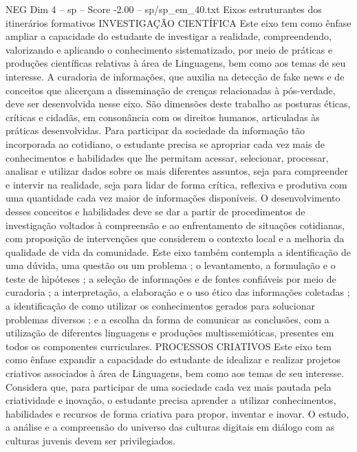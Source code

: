 \begin{textsample}{NEG Dim 4 – sp – Score -2.00 – sp/sp\_em\_40.txt}  \label{ex:f4_neg_036}
Eixos estruturantes dos itinerários formativos INVESTIGAÇÃO CIENTÍFICA Este eixo tem como ênfase ampliar a capacidade do estudante de investigar a realidade, compreendendo, valorizando e aplicando o conhecimento sistematizado, por meio de práticas e produções científicas relativas à área de Linguagens, bem como aos temas de seu interesse.
A curadoria de informações, que auxilia na detecção de fake news e de conceitos que alicerçam a disseminação de crenças relacionadas à pós-verdade, deve ser desenvolvida nesse eixo.
São dimensões deste trabalho as posturas éticas, críticas e cidadãs, em consonância com os direitos humanos, articuladas às práticas desenvolvidas.
Para participar da sociedade da informação tão incorporada ao cotidiano, o estudante precisa se apropriar cada vez mais de conhecimentos e habilidades que lhe permitam acessar, selecionar, processar, analisar e utilizar dados sobre os mais diferentes assuntos, seja para compreender e intervir na realidade, seja para lidar de forma crítica, reflexiva e produtiva com uma quantidade cada vez maior de informações disponíveis.
O desenvolvimento desses conceitos e habilidades deve se dar a partir de procedimentos de investigação voltados à compreensão e ao enfrentamento de situações cotidianas, com proposição de intervenções que considerem o contexto local e a melhoria da qualidade de vida da comunidade.
Este eixo também contempla a identificação de uma dúvida, uma questão ou um problema ; o levantamento, a formulação e o teste de hipóteses ; a seleção de informações e de fontes confiáveis por meio de curadoria ; a interpretação, a elaboração e o uso ético das informações coletadas ; a identificação de como utilizar os conhecimentos gerados para solucionar problemas diversos ; e a escolha da forma de comunicar as conclusões, com a utilização de diferentes linguagens e produções multissemióticas, presentes em todos os componentes curriculares.
PROCESSOS CRIATIVOS Este eixo tem como ênfase expandir a capacidade do estudante de idealizar e realizar projetos criativos associados à área de Linguagens, bem como aos temas de seu interesse.
Considera que, para participar de uma sociedade cada vez mais pautada pela criatividade e inovação, o estudante precisa aprender a utilizar conhecimentos, habilidades e recursos de forma criativa para propor, inventar e inovar.
O estudo, a análise e a compreensão do universo das culturas digitais em diálogo com as culturas juvenis devem ser privilegiados.

\end{textsample}
